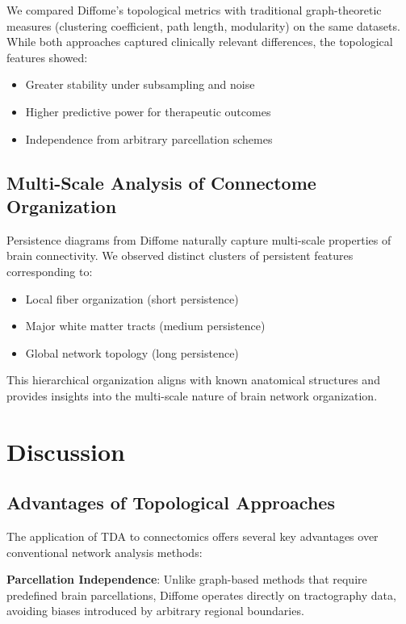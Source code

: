 \documentclass[12pt,a4paper]{article}
\begin{document}
We compared Diffome's topological metrics with traditional graph-theoretic measures (clustering coefficient, path length, modularity) on the same datasets. While both approaches captured clinically relevant differences, the topological features showed:
\begin{itemize}
    \item Greater stability under subsampling and noise
    \item Higher predictive power for therapeutic outcomes
    \item Independence from arbitrary parcellation schemes
\end{itemize}

\subsection{Multi-Scale Analysis of Connectome Organization}

Persistence diagrams from Diffome naturally capture multi-scale properties of brain connectivity. We observed distinct clusters of persistent features corresponding to:
\begin{itemize}
    \item Local fiber organization (short persistence)
    \item Major white matter tracts (medium persistence)
    \item Global network topology (long persistence)
\end{itemize}

This hierarchical organization aligns with known anatomical structures and provides insights into the multi-scale nature of brain network organization.

\section{Discussion}

\subsection{Advantages of Topological Approaches}

The application of TDA to connectomics offers several key advantages over conventional network analysis methods:

\textbf{Parcellation Independence}: Unlike graph-based methods that require predefined brain parcellations, Diffome operates directly on tractography data, avoiding biases introduced by arbitrary regional boundaries.
\end{document}
